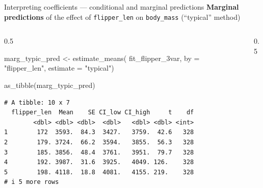\documentclass[
  10pt,
  ignorenonframetext,
  aspectratio=169,
  t]{beamer}
\newenvironment{Shaded}{\begin{snugshade}}{\end{snugshade}}
\newcommand{\AttributeTok}[1]{\textcolor[rgb]{0.40,0.45,0.13}{#1}}
\newcommand{\DecValTok}[1]{\textcolor[rgb]{0.68,0.00,0.00}{#1}}
\newcommand{\FunctionTok}[1]{\textcolor[rgb]{0.28,0.35,0.67}{#1}}
\newcommand{\NormalTok}[1]{\textcolor[rgb]{0.00,0.23,0.31}{#1}}
\newcommand{\OtherTok}[1]{\textcolor[rgb]{0.00,0.23,0.31}{#1}}
\newcommand{\SpecialCharTok}[1]{\textcolor[rgb]{0.37,0.37,0.37}{#1}}
\newcommand{\StringTok}[1]{\textcolor[rgb]{0.13,0.47,0.30}{#1}}
\newcommand{\bluebold}[1]{\textcolor{bluebeamer}{\textbf{#1}}}
\let\oldtexttt\texttt
\renewcommand{\texttt}[1]{\colorbox{gray!20}{\oldtexttt{#1}}}
\begin{document}
\begin{frame}[fragile]{Interpreting coefficients --- conditional and
marginal predictions}
\protect{}\label{interpreting-coefficients-conditional-and-marginal-predictions-5}
\bluebold{Marginal predictions} of the effect of \texttt{flipper\_len}
on \texttt{body\_mass} (``typical'' method)

\begin{columns}[T]
\begin{column}{0.5\linewidth}
\scriptsize

\begin{Shaded}
\begin{Highlighting}[]
\NormalTok{marg\_typic\_pred }\OtherTok{\textless{}{-}} \FunctionTok{estimate\_means}\NormalTok{(}
\NormalTok{  fit\_flipper\_3var,}
  \AttributeTok{by =} \StringTok{"flipper\_len"}\NormalTok{,}
  \AttributeTok{estimate =} \StringTok{"typical"}\NormalTok{)}

\FunctionTok{as\_tibble}\NormalTok{(marg\_typic\_pred)}
\end{Highlighting}
\end{Shaded}

\begin{verbatim}
# A tibble: 10 x 7
  flipper_len  Mean    SE CI_low CI_high     t    df
        <dbl> <dbl> <dbl>  <dbl>   <dbl> <dbl> <int>
1        172  3593.  84.3  3427.   3759.  42.6   328
2        179. 3724.  66.2  3594.   3855.  56.3   328
3        185. 3856.  48.4  3761.   3951.  79.7   328
4        192. 3987.  31.6  3925.   4049. 126.    328
5        198. 4118.  18.8  4081.   4155. 219.    328
# i 5 more rows
\end{verbatim}

\normalsize
\end{column}

\begin{column}{0.5\linewidth}
\scriptsize

\begin{Shaded}
\end{Shaded}
\end{column}
\end{columns}
\end{frame}
\end{document}
